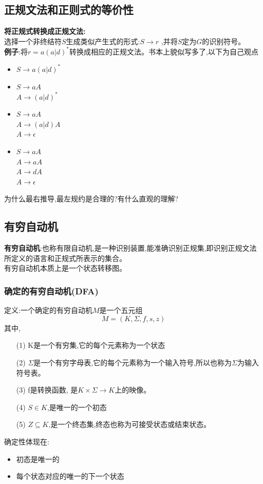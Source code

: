 \documentclass[UTF8,a4paper]{ctexart}
\newcommand{\spaceline}{\vspace{\baselineskip}}
\begin{document}
  \subsection{正规文法和正则式的等价性}
  \textbf{将正规式转换成正规文法:}\\
  选择一个非终结符$S$生成类似产生式的形式:$S\to r$ ,并将$S$定为$G$的识别符号。\\

  \textbf{例子}:将$r = a(a|d)^*$转换成相应的正规文法。{\color{red}书本上貌似写多了,以下为自己观点}
  \begin{itemize}
    \item
    $S\to a(a|d)^*$
    \item
    $S\to aA$\\
    $A \to (a|d)^*$
    \item
    $S \to aA$\\
    $A \to (a|d)A$  \\
    $A \to \epsilon$
    \item
    $S \to aA$\\
    $A \to aA$\\
    $A \to dA$\\
    $A \to \epsilon$
  \end{itemize}

  {\color{red}为什么最右推导,最左规约是合理的?有什么直观的理解?}

  \subsection{有穷自动机}
  \textbf{有穷自动机}:也称有限自动机,是一种识别装置,能准确识别正规集,即识别正规文法所定义的语言和正规式所表示的集合。\\
  有穷自动机本质上是一个状态转移图。

  \spaceline
  \subsubsection{确定的有穷自动机(DFA)}
  定义:一个确定的有穷自动机$M$是一个五元组
  \[M = (K , \Sigma , f , s , z)\]
  其中,
  \begin{itemize}
    \item [(1)] K是一个有穷集,它的每个元素称为一个状态
    \item [(2)] $\Sigma$是一个有穷字母表,它的每个元素称为一个输入符号,所以也称为$\Sigma$为输入符号表。
    \item [(3)] f是转换函数, 是$K\times \Sigma \to K$上的映像。
    \item [(4)] $S\in K$,是唯一的一个初态
    \item [(5)] $Z \subseteq  K$,是一个终态集,终态也称为可接受状态或结束状态。
  \end{itemize}
  确定性体现在:
  \begin{itemize}
    \item 初态是唯一的
    \item 每个状态对应的唯一的下一个状态
  \end{itemize}
\end{document}
